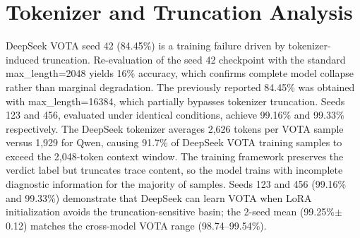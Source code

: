\begin{table}[h!]
\centering
\caption{Full results for DeepSeek-Coder-6.7B across all conditions and seeds. \textit{exception\_only} is consistent across seeds: 99.33/99.50/99.33 ($\sigma{=}$0.10pp).}
\label{tab:full_deepseek}
\small
{}
\end{table}

\section{Tokenizer and Truncation Analysis}
\label{sec:tokenizer_analysis}

DeepSeek VOTA seed 42 (84.45\%) is a training failure driven by tokenizer-induced truncation.
Re-evaluation of the seed 42 checkpoint with the standard max\_length=2048 yields 16\% accuracy, which confirms complete model collapse rather than marginal degradation.
The previously reported 84.45\% was obtained with max\_length=16384, which partially bypasses tokenizer truncation.
Seeds 123 and 456, evaluated under identical conditions, achieve 99.16\% and 99.33\% respectively.
The DeepSeek tokenizer averages 2{,}626 tokens per VOTA sample versus 1{,}929 for Qwen, causing 91.7\% of DeepSeek VOTA training samples to exceed the 2{,}048-token context window.
The training framework preserves the verdict label but truncates trace content, so the model trains with incomplete diagnostic information for the majority of samples.
Seeds 123 and 456 (99.16\% and 99.33\%) demonstrate that DeepSeek can learn VOTA when LoRA initialization avoids the truncation-sensitive basin; the 2-seed mean (99.25\%$\pm$0.12) matches the cross-model VOTA range (98.74--99.54\%).

